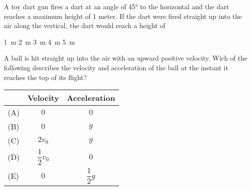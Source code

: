 \documentclass{../../../oss-ap12ibhl}
\begin{document}
\begin{questions}
\begin{oneparchoices}
    \choice
    \choice
  \end{oneparchoices}

  \uplevel{\rule{\linewidth}{.6pt}}
  
  \question A toy dart gun fires a dart at an angle of \ang{45} to the
  horizontal and the dart reaches a maximum height of 1 meter. If the dart
  were fired straight up into the air along the vertical, the dart would
  reach a height of
  
  \begin{oneparchoices}
    \choice\SI{1}{\metre}\hspace{.4in}
    \choice\SI{2}{\metre}\hspace{.4in}
    \choice\SI{3}{\metre}\hspace{.4in}
    \choice\SI{4}{\metre}\hspace{.4in}
    \choice\SI{5}{\metre}
  \end{oneparchoices}
  \vspace{.1in}

  \uplevel{\rule{\linewidth}{.6pt}}
  
  \question A ball is hit straight up into the air with an upward positive
  velocity. Wich of the following describes the velocity and acceleration
  of the ball at the instant it reaches the top of its flight?
  
  \begin{tabular}{lcc}
    & Velocity & Acceleration\\ \hline
    (A) & $0$ & $0$\\
    (B) & $0$ & $g$\\
    (C) & $2v_0$ & $g$\\
    (D) & $\dfrac12v_0$ & $0$\\
    (E) & $0$ & $\dfrac12g$
  \end{tabular}
  \uplevel{\rule{\linewidth}{.6pt}}
  

\end{questions}
\end{document}
